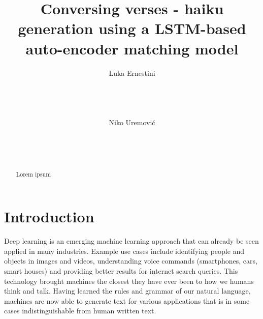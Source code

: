 \documentclass{acm_proc_article-sp}
\begin{document}
\title{Conversing verses - haiku generation using a LSTM-based auto-encoder matching model}

\author{
\alignauthor
Luka Ernestini\\
       \\
       \\
       \\

\alignauthor
Niko Uremović\\
       \\
       \\
       \\
}

\maketitle
\begin{abstract}

Lorem ipsum

\end{abstract}




\section{Introduction}

Deep learning is an emerging machine learning approach that can already be seen applied in many industries. Example use cases include identifying people and objects in images and videos, understanding voice commands (smartphones, cars, smart houses) and providing better results for internet search queries. This technology brought machines the closest they have ever been to how we humans think and talk. Having learned the rules and grammar of our natural language, machines are now able to generate text for various applications that is in some cases indistinguishable from human written text. \cite{pawade2018story}
\end{document}
